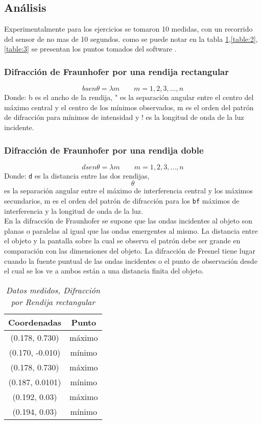 \documentclass{article}									%
\begin{document}
\subsection{Análisis}
Experimentalmente para los ejercicios se tomaron 10 medidas, con un recorrido del sensor de no mas de 10 segundos. 
como se puede notar en la tabla \ref{table:1},\ref{table:2},\ref{table:3} se presentan los puntos tomados del software .\\
\subsubsection{Difracción de Fraunhofer por una rendija rectangular}
$$bsen\theta =\lambda m\quad \quad m=1,2,3,…,n$$
Donde: b es el ancho de la rendija, " es la separación angular entre el centro del máximo central y el centro de los mínimos observados, m es el orden del patrón de difracción para mínimos de intensidad y ! es la longitud de onda de la luz incidente.
\subsubsection{Difracción de Fraunhofer por una rendija doble}
$$dsen\theta =\lambda m\quad \quad m=1,2,3,…,n$$
Donde: \texttt{d} es la distancia entre las dos rendijas, $$\theta$$ es la separación angular entre el máximo de interferencia central y los máximos secundarios, m es el orden del patrón de difracción para los \texttt{bf} máximos de interferencia y la longitud de onda de la luz.
\\
En la difracción de Fraunhofer se supone que las ondas incidentes al objeto son planas o paralelas al igual que las ondas emergentes al mismo. La distancia entre el objeto y la pantalla sobre la cual se observa el patrón debe ser grande en comparación con las dimensiones del objeto.
La difracción de Fresnel tiene lugar cuando la fuente puntual de las ondas incidentes o el punto de observación desde el cual se los ve a ambos están a una distancia finita del objeto.
\begin{table}[H]
\begin{center}
\begin{tabular}{ |c|c| } 
 \hline
Coordenadas &  Punto\\ 
 \hline
(0.178, 0.730) & máximo \\ 
(0.170, -0.010) & mínimo\\ 
(0.178, 0.730) & máximo \\
(0.187, 0.0101) & mínimo\\
(0.192, 0.03) & máximo \\
(0.194, 0.03) & mínimo\\
 \hline
\end{tabular}
\caption{ \emph{Datos medidos, Difracción por Rendija rectangular}}
\label{table:1}
\end{center}
\end{table}
\end{document}
